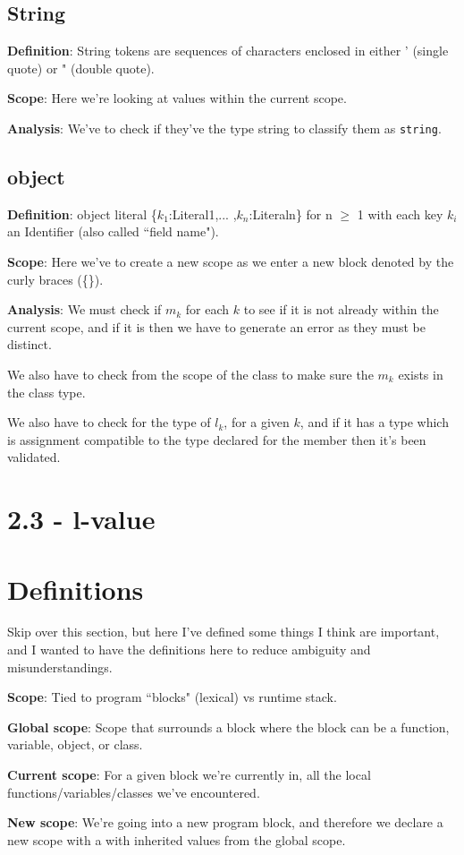 \documentclass[11pt, oneside]{article}
\begin{document}
\subsection*{String}
\par \textbf{Definition}: String tokens are sequences of characters enclosed in either ' (single quote) or " (double quote).
\par \textbf{Scope}: Here we're looking at values within the current scope.
\par \textbf{Analysis}: We've to check if they've the type string to classify them as  \texttt{string}.

\subsection*{object}
\par \textbf{Definition}: object literal \{$k_1$:Literal1,... ,$k_n$:Literaln\} for n $\geq$ 1 with each key $k_i$ an Identifier (also called ``field name").
\par \textbf{Scope}: Here we've to create a new scope as we enter a new block denoted by the curly braces (\{\}).
\par \textbf{Analysis}: We must check if $m_k$ for each $k$ to see if it is not already within the current scope, and if it is then we have to generate an error as they must be distinct.
\par We also have to check from the scope of the class to make sure the $m_k$ exists in the class type.
\par We also have to check for the type of $l_k$, for a given $k$, and if it has a type which is assignment compatible to the type declared for the member then it's been validated.

\section*{2.3 - l-value}
\par 

\section*{Definitions}
\par Skip over this section, but here I've defined some things I think are important, and I wanted to have the definitions here to reduce ambiguity and misunderstandings. 
\par \textbf{Scope}: Tied to program ``blocks" (lexical) vs runtime stack.
\par \textbf{Global scope}: Scope that surrounds a block where the block can be a function, variable, object, or class.
\par \textbf{Current scope}: For a given block we're currently in, all the local functions/variables/classes we've encountered.
\par \textbf{New scope}: We're going into a new program block, and therefore we declare a new scope with a with inherited values from the global scope.
\end{document}
